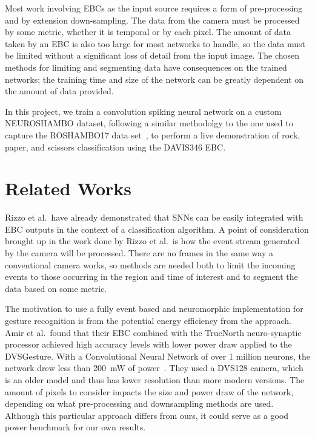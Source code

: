 \documentclass[conference]{IEEEtran}
\begin{document}
Most work involving EBCs as the input source requires a form of pre-processing and by extension down-sampling. The data from the camera must be processed by some metric, whether it is temporal or by each pixel. The amount of data taken by an EBC is also too large for most networks to handle, so the data must be limited without a significant loss of detail from the input image. The chosen methods for limiting and segmenting data have consequences on the trained networks; the training time and size of the network can be greatly dependent on the amount of data provided.

In this project, we train a convolution spiking neural network on a custom NEUROSHAMBO dataset, following a similar methodolgy to the one used to capture the ROSHAMBO17 data set~\cite{RPS_Dataset}, to perform a live demonstration of rock, paper, and scissors classification using the DAVIS346 EBC.

\section{Related Works}
\label{sec:related_works}

Rizzo et al.\ have already demonstrated that SNNs can be easily integrated with EBC outputs in the context of a classification algorithm\cite{Rizzo_Mccombs_Haynie_Schuman_Plank_2023}. A point of consideration brought up in the work done by Rizzo et al.\ is how the event stream generated by the camera will be processed. There are no frames in the same way a conventional camera works, so methods are needed both to limit the incoming events to those occurring in the region and time of interest and to segment the data based on some metric.

The motivation to use a fully event based and neuromorphic implementation for gesture recognition is from the potential energy efficiency from the approach. Amir et al.\ found that their EBC combined with the TrueNorth neuro-synaptic processor achieved high accuracy levels with lower power draw applied to the DVSGesture. With a Convolutional Neural Network of over 1 million neurons, the network drew less than 200~mW of power~\cite{Amir_Taba_et_al._2017}. They used a DVS128 camera, which is an older model and thus has lower resolution than more modern versions. The amount of pixels to consider impacts the size and power draw of the network, depending on what pre-processing and downsampling methods are used. Although this particular approach differs from ours, it could serve as a good power benchmark for our own results.
\end{document}
